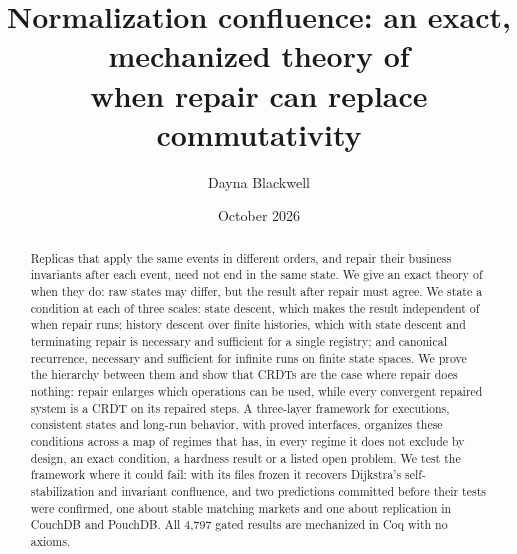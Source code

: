 \documentclass[11pt]{article}
\title{Normalization confluence: an exact, mechanized theory of\\when repair can replace commutativity}
\author{Dayna Blackwell}
\date{October 2026}
\theoremstyle{definition}
\theoremstyle{remark}
\begin{document}
\maketitle

\begin{abstract}
Replicas that apply the same events in different orders, and repair their business invariants after
each event, need not end in the same state. We give an exact theory of when they do: raw states may
differ, but the result after repair must agree. We state a condition at each of three
scales: state descent, which makes the result independent of when repair runs; history descent over finite histories, which with
state descent and terminating repair is necessary and sufficient for a single registry; and canonical
recurrence, necessary and sufficient for infinite runs on finite state spaces. We prove the hierarchy
between them and show that CRDTs are the case where
repair does nothing: repair enlarges which operations can be used, while every convergent repaired
system is a CRDT on its repaired steps. A three-layer framework for executions, consistent states and
long-run behavior, with proved interfaces, organizes these conditions across a map of regimes that has,
in every regime it does not exclude by design, an exact condition, a hardness result or a listed open
problem. We test the framework
where it could fail: with its files frozen it recovers Dijkstra's self-stabilization and invariant
confluence, and two predictions committed before their tests were confirmed, one about stable matching
markets and one about replication in CouchDB and PouchDB. All 4{,}797 gated results are mechanized in Coq with
no axioms.
\end{abstract}























\end{document}
